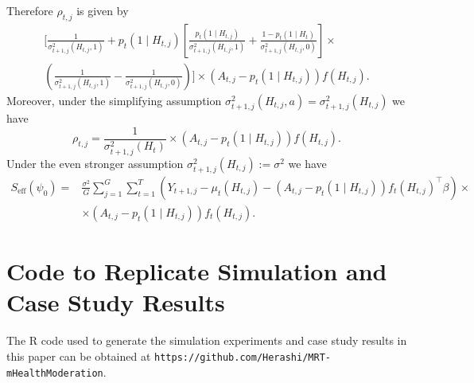 \documentclass[supplementary, lineno]{biometrika}
\begin{document}
Therefore $\rho_{t,j}$ is given by
\begin{align*}
\bigg[ \frac{1}{\sigma^2_{t+1,j} (H_{t,j}, 1)} + p_t ( 1 \mid H_{t,j}) \left[  \frac{p_t (1 \mid H_{t,j} )}{\sigma^2_{t+1,j} (H_{t,j}, 1)} + \frac{1-p_t (1 \mid H_t )}{\sigma^2_{t+1,j} (H_{t,j}, 0)} \right] \times \\
\left( \frac{1}{\sigma^2_{t+1,j} (H_{t,j}, 1)}  - \frac{1}{\sigma^2_{t+1,j} (H_{t,j}, 0)} \right)
 \bigg] \times \left( A_{t,j} - p_t (1 \mid H_{t,j}) \right) f(H_{t,j}).
\end{align*}
Moreover, under the simplifying assumption $\sigma^2_{t+1,j} (H_{t,j}, a) = \sigma^2_{t+1,j} (H_{t,j})$ we have
$$
\rho_{t,j} = \frac{1}{\sigma^2_{t+1,j} (H_t)} \times \left( A_{t,j} - p_t (1 \mid H_{t,j}) \right) f(H_{t,j}).
$$
Under the even stronger assumption $\sigma^2_{t+1,j} (H_{t,j}) := \sigma^2$ we have
\begin{align*}
S_{\text{eff}} (\psi_0) =&  \frac{\sigma^2}{G} \sum_{j=1}^G \sum_{t=1}^T \left(Y_{t+1,j} - \mu_t (H_{t,j}) - (A_{t,j} - p_t (1 \mid H_{t,j})) f_t (H_{t,j})^\top \beta \right) \times \\
&\times (A_{t,j} - p_t (1 \mid H_{t,j})) f_t (H_{t,j}).
\end{align*}

\section{Code to Replicate Simulation and Case Study Results}
The R code used to generate the simulation experiments and case study results in this paper can be obtained at \verb"https://github.com/Herashi/MRT-mHealthModeration".



\end{document}

